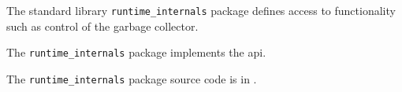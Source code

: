 
The standard library {\tt runtime\_internals} package defines access to functionality 
such as control of the garbage collector.

The {\tt runtime\_internals} package implements the 
 api.

The {\tt runtime\_internals} package source code is in .





